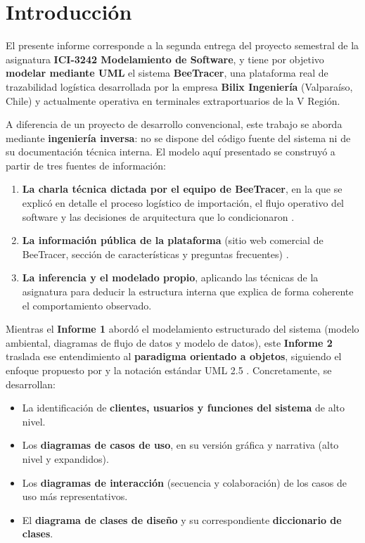 \chapter{Introducción}
\label{cap:introduccion}

El presente informe corresponde a la segunda entrega del proyecto semestral de la asignatura
\textbf{ICI-3242 Modelamiento de Software}, y tiene por objetivo \textbf{modelar mediante UML} el
sistema \textbf{BeeTracer}, una plataforma real de trazabilidad logística desarrollada por la
empresa \textbf{Bilix Ingeniería} (Valparaíso, Chile) y actualmente operativa en terminales
extraportuarios de la V Región.

A diferencia de un proyecto de desarrollo convencional, este trabajo se aborda mediante
\textbf{ingeniería inversa}: no se dispone del código fuente del sistema ni de su documentación
técnica interna. El modelo aquí presentado se construyó a partir de tres fuentes de información:

\begin{enumerate}
    \item \textbf{La charla técnica dictada por el equipo de BeeTracer}, en la que se explicó en
          detalle el proceso logístico de importación, el flujo operativo del software y las
          decisiones de arquitectura que lo condicionaron \parencite{charlabeetracer2026}.
    \item \textbf{La información pública de la plataforma} (sitio web comercial de BeeTracer,
          sección de características y preguntas frecuentes) \parencite{bilix_sf}.
    \item \textbf{La inferencia y el modelado propio}, aplicando las técnicas de la asignatura para
          deducir la estructura interna que explica de forma coherente el comportamiento observado.
\end{enumerate}

Mientras el \textbf{Informe 1} abordó el modelamiento estructurado del sistema (modelo ambiental,
diagramas de flujo de datos y modelo de datos), este \textbf{Informe 2} traslada ese entendimiento
al \textbf{paradigma orientado a objetos}, siguiendo el enfoque propuesto por \textcite{larman2003}
y la notación estándar UML 2.5 \parencite{omg2017}. Concretamente, se desarrollan:

\begin{itemize}
    \item La identificación de \textbf{clientes, usuarios y funciones del sistema} de alto nivel.
    \item Los \textbf{diagramas de casos de uso}, en su versión gráfica y narrativa (alto nivel y
          expandidos).
    \item Los \textbf{diagramas de interacción} (secuencia y colaboración) de los casos de uso más
          representativos.
    \item El \textbf{diagrama de clases de diseño} y su correspondiente \textbf{diccionario de
          clases}.
\end{itemize}

